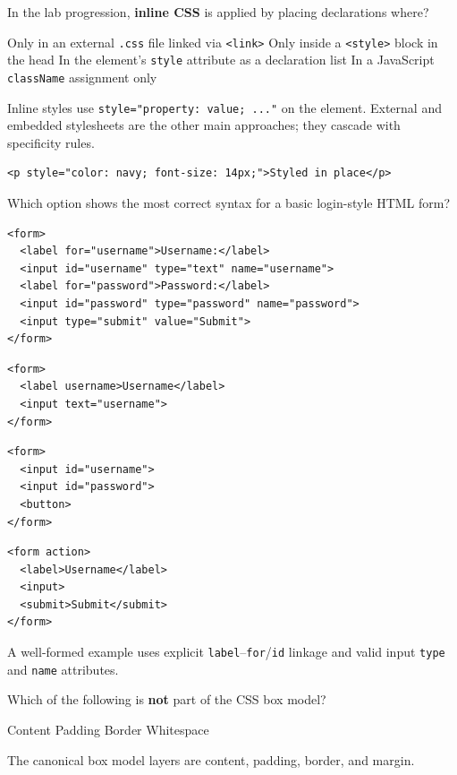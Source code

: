 \question[4]
In the lab progression, \textbf{inline CSS} is applied by placing declarations where?
\begin{choices}
  \choice Only in an external \texttt{.css} file linked via \texttt{<link>}
  \choice Only inside a \texttt{<style>} block in the head
  \CorrectChoice In the element's \texttt{style} attribute as a declaration list
  \choice In a JavaScript \texttt{className} assignment only
\end{choices}
\begin{solution}
  Inline styles use \texttt{style="property: value; ..."} on the element. External and embedded stylesheets are the other main approaches; they cascade with specificity rules.
\begin{lstlisting}[style=htmlinline]
<p style="color: navy; font-size: 14px;">Styled in place</p>
\end{lstlisting}
\end{solution}

\question[4]
Which option shows the most correct syntax for a basic login-style HTML form?
\begin{choices}
  \CorrectChoice
\begin{lstlisting}[style=htmlinline]
<form>
  <label for="username">Username:</label>
  <input id="username" type="text" name="username">
  <label for="password">Password:</label>
  <input id="password" type="password" name="password">
  <input type="submit" value="Submit">
</form>
\end{lstlisting}
  \choice
\begin{lstlisting}[style=htmlinline]
<form>
  <label username>Username</label>
  <input text="username">
</form>
\end{lstlisting}
  \choice
\begin{lstlisting}[style=htmlinline]
<form>
  <input id="username">
  <input id="password">
  <button>
</form>
\end{lstlisting}
  \choice
\begin{lstlisting}[style=htmlinline]
<form action>
  <label>Username</label>
  <input>
  <submit>Submit</submit>
</form>
\end{lstlisting}
\end{choices}
\begin{solution}
  A well-formed example uses explicit \texttt{label}--\texttt{for}/\texttt{id} linkage and valid input \texttt{type} and \texttt{name} attributes.
\end{solution}

\question[4]
Which of the following is \textbf{not} part of the CSS box model?
\begin{choices}
  \choice Content
  \choice Padding
  \choice Border
  \CorrectChoice Whitespace
\end{choices}
\begin{solution}
  The canonical box model layers are content, padding, border, and margin.
\end{solution}


